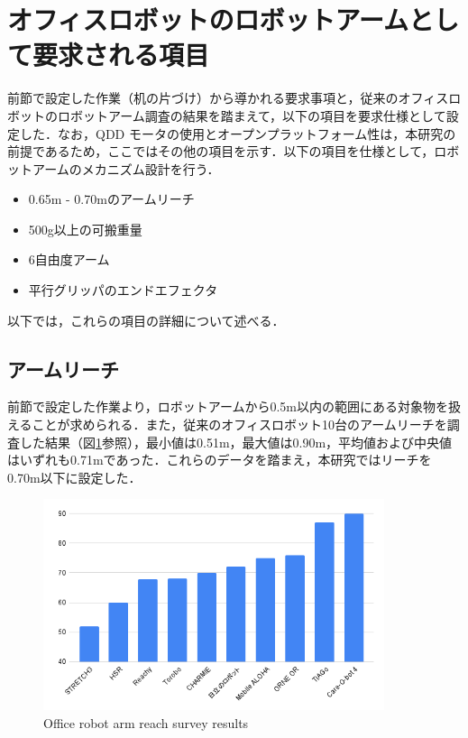 \section{オフィスロボットのロボットアームとして要求される項目}
前節で設定した作業（机の片づけ）から導かれる要求事項と，従来のオフィスロボットのロボットアーム調査の結果を踏まえて，以下の項目を要求仕様として設定した．なお，QDD モータの使用とオープンプラットフォーム性は，本研究の前提であるため，ここではその他の項目を示す．以下の項目を仕様として，ロボットアームのメカニズム設計を行う．
\begin{itemize}
  \item 0.65m - 0.70mのアームリーチ
  \item 500g以上の可搬重量
  \item 6自由度アーム
  \item 平行グリッパのエンドエフェクタ
\end{itemize}
以下では，これらの項目の詳細について述べる．

\subsection{アームリーチ}
前節で設定した作業より，ロボットアームから0.5m以内の範囲にある対象物を扱えることが求められる．また，従来のオフィスロボット10台のアームリーチを調査した結果（図\ref{fig:reach}参照），最小値は0.51m，最大値は0.90m，平均値および中央値はいずれも0.71mであった．これらのデータを踏まえ，本研究ではリーチを0.70m以下に設定した．
\begin{figure}[h]
  \centering
  \includegraphics[width=10cm]{images/2syou/reach.png}
  \caption{Office robot arm reach survey results}
  \label{fig:reach}
\end{figure}

